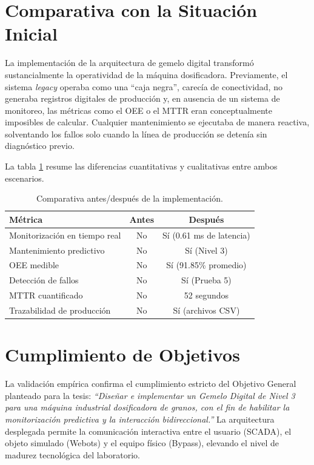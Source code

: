 \section{Comparativa con la Situación Inicial}

La implementación de la arquitectura de gemelo digital transformó sustancialmente la operatividad de la máquina dosificadora. Previamente, el sistema \textit{legacy} operaba como una ``caja negra'', carecía de conectividad, no generaba registros digitales de producción y, en ausencia de un sistema de monitoreo, las métricas como el OEE o el MTTR eran conceptualmente imposibles de calcular. Cualquier mantenimiento se ejecutaba de manera reactiva, solventando los fallos solo cuando la línea de producción se detenía sin diagnóstico previo.

La tabla \ref{tab:comparativa_inicial} resume las diferencias cuantitativas y cualitativas entre ambos escenarios.

\begin{table}[htbp]
\centering
\caption{Comparativa antes/después de la implementación.}
\label{tab:comparativa_inicial}
\begin{tabular}{|l|c|c|}
\hline
\textbf{Métrica} & \textbf{Antes} & \textbf{Después} \\
\hline
Monitorización en tiempo real & No & Sí (0.61 ms de latencia) \\
Mantenimiento predictivo & No & Sí (Nivel 3) \\
OEE medible & No & Sí (91.85\% promedio) \\
Detección de fallos & No & Sí (Prueba 5) \\
MTTR cuantificado & No & 52 segundos \\
Trazabilidad de producción & No & Sí (archivos CSV) \\
\hline
\end{tabular}
\end{table}

\section{Cumplimiento de Objetivos}

La validación empírica confirma el cumplimiento estricto del Objetivo General planteado para la tesis: \textit{``Diseñar e implementar un Gemelo Digital de Nivel 3 para una máquina industrial dosificadora de granos, con el fin de habilitar la monitorización predictiva y la interacción bidireccional.''} La arquitectura desplegada permite la comunicación interactiva entre el usuario (SCADA), el objeto simulado (Webots) y el equipo físico (Bypass), elevando el nivel de madurez tecnológica del laboratorio.

